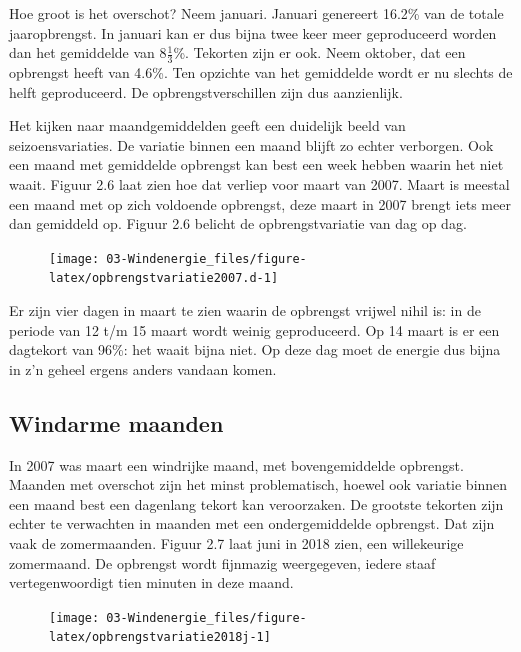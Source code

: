 \documentclass[
  11pt,
  a4paper,
]{book}
\begin{document}
Hoe groot is het overschot? Neem januari. Januari genereert 16.2\% van de totale jaaropbrengst. In januari kan
er dus bijna twee keer meer geproduceerd worden dan het gemiddelde van \(8\frac{1}{3}\)\%. Tekorten zijn er ook. Neem oktober, dat een opbrengst heeft van 4.6\%. Ten opzichte van het gemiddelde wordt er nu slechts de helft geproduceerd. De opbrengstverschillen zijn dus aanzienlijk.

Het kijken naar maandgemiddelden geeft een duidelijk beeld van seizoensvariaties. De variatie binnen een maand blijft zo echter verborgen. Ook een maand met gemiddelde opbrengst kan best een week hebben waarin het niet waait. Figuur 2.6 laat zien hoe dat verliep voor maart van 2007. Maart is meestal een maand met op zich voldoende opbrengst, deze maart in 2007 brengt iets meer dan gemiddeld op. Figuur 2.6 belicht de opbrengstvariatie van dag op dag.

\begin{figure}[b]

{\centering \texttt{[image: 03-Windenergie\_files/figure-latex/opbrengstvariatie2007.d-1]} 

}

\end{figure}

Er zijn vier dagen in maart te zien waarin de opbrengst vrijwel nihil is: in de periode van 12 t/m 15 maart wordt weinig geproduceerd. Op 14 maart is er een dagtekort van 96\%: het waait bijna niet. Op deze dag moet de energie dus bijna in z'n geheel ergens anders vandaan komen.

\hypertarget{windarme-maanden}{%
\subsection{Windarme maanden}\label{windarme-maanden}}

In 2007 was maart een windrijke maand, met bovengemiddelde opbrengst. Maanden met overschot zijn het minst problematisch, hoewel ook variatie binnen een maand best een dagenlang tekort kan veroorzaken. De grootste tekorten zijn echter te verwachten in maanden met een ondergemiddelde opbrengst. Dat zijn vaak de zomermaanden. Figuur 2.7 laat juni in 2018 zien, een willekeurige zomermaand. De opbrengst wordt fijnmazig weergegeven, iedere staaf vertegenwoordigt tien minuten in deze maand.

\begin{figure}[t]

{\centering \texttt{[image: 03-Windenergie\_files/figure-latex/opbrengstvariatie2018j-1]} 

}

\end{figure}
\end{document}
